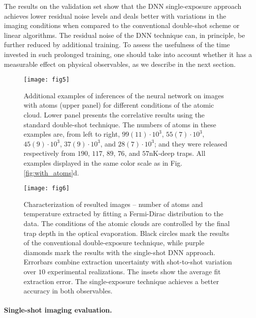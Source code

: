 \documentclass[twocolumn,groupedaddress,longbibliography]{revtex4-1}
\begin{document}
The results on the validation set show that the DNN single-exposure approach achieves lower residual noise levels and deals better with variations in the imaging conditions when compared to the conventional double-shot scheme or linear algorithms. The residual noise of the DNN technique can, in principle, be further reduced by additional training. To assess the usefulness of the time invested in such prolonged training, one should take into account whether it has a measurable effect on physical observables, as we describe in the next section.

\begin{figure*}
\centering
\texttt{[image: fig5]}
\caption{Additional examples of inferences of the neural network on images with atoms (upper panel) for different conditions of the atomic cloud. Lower panel presents the correlative results using the standard double-shot technique. The numbers of atoms in these examples are, from left to right, $99(11)\cdot10^3$, $55(7)\cdot10^3$, $45(9)\cdot10^3$, $37(9)\cdot10^3$, and $28(7)\cdot10^3$; and they were released respectively from $190$, $117$, $89$, $76$, and $57\mathrm{nK}$-deep traps. All examples displayed in the same color scale as in Fig.\,\ref{fig:with_atoms}d.
	}
	\label{fig:with_atoms_more_exps}
\end{figure*}

\begin{figure*}
\centering
\texttt{[image: fig6]}
\caption{Characterization of resulted images -- number of atoms and temperature extracted by fitting a Fermi-Dirac distribution to the data. The conditions of the atomic clouds are controlled by the final trap depth in the optical evaporation. Black circles mark the results of the conventional double-exposure technique, while purple diamonds mark the results with the single-shot DNN approach. Errorbars combine extraction uncertainty with shot-to-shot variation over $10$ experimental realizations. The insets show the average fit extraction error. The single-exposure technique achieves a better accuracy in both observables.}
\label{fig:fitting_results}
\end{figure*}

\paragraph*{Single-shot imaging evaluation.}
\end{document}
